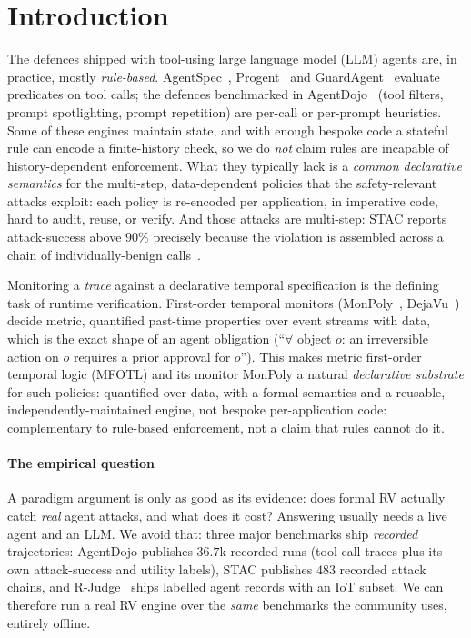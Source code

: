 \documentclass[sigconf]{acmart}
\begin{document}
\section{Introduction}
\label{sec:intro}

The defences shipped with tool-using large language model (LLM) agents are, in
practice, mostly \emph{rule-based}. AgentSpec~\cite{agentspec2026}, Progent~\cite{progent2025} and
GuardAgent~\cite{guardagent2024} evaluate predicates on tool calls; the defences
benchmarked in AgentDojo~\cite{agentdojo2024} (tool filters, prompt spotlighting,
prompt repetition) are per-call or per-prompt heuristics. Some of these engines
maintain state, and with enough bespoke code a stateful rule can encode a
finite-history check, so we do \emph{not} claim rules are incapable of
history-dependent enforcement. What they typically lack is a \emph{common
declarative semantics} for the multi-step, data-dependent policies that the
safety-relevant attacks exploit: each policy is re-encoded per application, in
imperative code, hard to audit, reuse, or verify. And those attacks are multi-step:
STAC reports attack-success above $90\%$ precisely because the violation is assembled
across a chain of individually-benign calls~\cite{stac2026}.

Monitoring a \emph{trace} against a declarative temporal specification is the
defining task of runtime verification. First-order temporal
monitors (MonPoly~\cite{monpoly2014}, DejaVu~\cite{havelund2018dejavu}) decide
metric, quantified past-time properties over event streams with data, which is the
exact shape of an agent obligation (``$\forall$ object $o$: an irreversible action
on $o$ requires a prior approval for $o$''). This makes metric first-order temporal
logic (MFOTL) and its monitor MonPoly a natural \emph{declarative substrate} for
such policies: quantified over data, with a formal
semantics and a reusable, independently-maintained engine, not bespoke
per-application code: complementary to rule-based enforcement, not a claim that
rules cannot do it.

\paragraph{The empirical question} A paradigm argument is only as good as its
 evidence: does formal RV actually catch \emph{real} agent attacks, and what does it
cost? Answering usually needs a live agent and an LLM. We avoid that: three major
benchmarks ship \emph{recorded} trajectories: AgentDojo publishes $36.7$k
recorded runs (tool-call traces plus its own attack-success and utility labels),
STAC publishes $483$ recorded attack chains, and R-Judge~\cite{rjudge2024} ships
labelled agent records with an IoT subset. We can therefore run a real RV engine
over the \emph{same} benchmarks the community uses, entirely offline.
\end{document}
